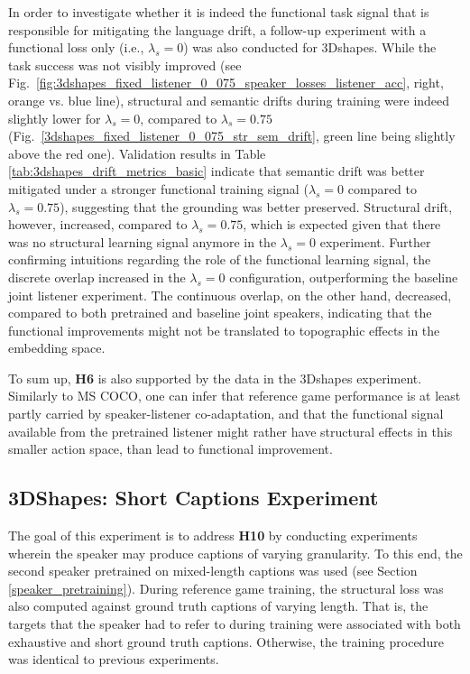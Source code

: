 In order to investigate whether it is indeed the functional task signal that is responsible for mitigating the language drift, a follow-up experiment with a functional loss only (i.e., $\lambda_s=0$) was also conducted for 3Dshapes. While the task success was not visibly improved (see Fig.~\ref{fig:3dshapes_fixed_listener_0_075_speaker_losses_listener_acc}, right, orange vs. blue line), structural and semantic drifts during training were indeed slightly lower for $\lambda_s=0$, compared to $\lambda_s=0.75$ (Fig.~\ref{3dshapes_fixed_listener_0_075_str_sem_drift}, green line being slightly above the red one). Validation results in Table \ref{tab:3dshapes_drift_metrics_basic} indicate that semantic drift was better mitigated under a stronger functional training signal ($\lambda_s =0$ compared to $\lambda_s =0.75$), suggesting that the grounding was better preserved. Structural drift, however, increased, compared to $\lambda_s =0.75$, which is expected given that there was no structural learning signal anymore in the $\lambda_s =0$ experiment. Further confirming intuitions regarding the role of the functional learning signal, the discrete overlap increased in the $\lambda_s =0$ configuration, outperforming the baseline joint listener experiment. The continuous overlap, on the other hand, decreased, compared to both pretrained and baseline joint speakers, indicating that the functional improvements might not be translated to topographic effects in the embedding space.  

To sum up, \textbf{H6} is also supported by the data in the 3Dshapes experiment. Similarly to MS COCO, one can infer that reference game performance is at least partly carried by speaker-listener co-adaptation, and that the functional signal available from the pretrained listener might rather have structural effects in this smaller action space, than lead to functional improvement.   

\subsection{3DShapes: Short Captions Experiment}

The goal of this experiment is to address \textbf{H10} by conducting experiments wherein the speaker may produce captions of varying granularity.
To this end, the second speaker pretrained on mixed-length captions was used (see Section \ref{speaker_pretraining}). During reference game training, the structural loss was also computed against ground truth captions of varying length. That is, the targets that the speaker had to refer to during training were associated with both exhaustive and short ground truth captions. Otherwise, the training procedure was identical to previous experiments.

